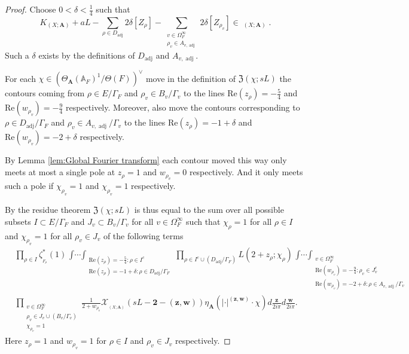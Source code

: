\documentclass[10pt,a4paper]{amsart}
\DeclareMathOperator{\Eff}{\overline{Eff}}
\DeclareMathOperator{\adj}{adj}
\newcommand{\A}{\mathbb{A}}
\renewcommand{\Re}{\mathrm{Re}}
\begin{document}
\begin{proof}
	Choose $0 < \delta < \frac{1}{4}$ such that 
	\begin{equation}
		K_{(X; \mathbf{A})} + aL - \sum_{\rho \in D_{\adj}} 2\delta [Z_{\rho}] - \sum_{\substack{v \in \Omega_{F}^{\infty} \\ \rho_v \in A_{v, \adj}}} 2\delta [Z_{\rho_v}] \in \Eff_{(X; \mathbf{A})}. 
		\label{Choice of delta}
	\end{equation}
	Such a $\delta$ exists by the definitions of $D_{\adj}$ and $A_{v, \adj}$.
	
	For each $\chi \in (\Theta_{\mathbf{A}}(\A_F)^1/\Theta(F))^{\vee}$ move in the definition of $\mathfrak{Z}(\chi; sL)$ the contours coming from $\rho \in E / \Gamma_F$ and $\rho_v \in B_v / \Gamma_v$ to the lines $\Re(z_{\rho}) = -\frac{5}{4}$ and $\Re(w_{\rho_v}) = - \frac{9}{4}$ respectively. Moreover, also move the contours corresponding to $\rho \in D_{\adj} / \Gamma_F$ and $\rho_v \in A_{v, \adj} / \Gamma_v$ to the lines $\Re(z_{\rho}) = -1 + \delta$ and $\Re(w_{\rho_v}) = - 2 + \delta$ respectively.
	
	By Lemma \ref{lem:Global Fourier transform} each contour moved this way only meets at most a single pole at $z_{\rho} = 1$ and $w_{\rho_v} = 0$ respectively. And it only meets such a pole if $\chi_{\rho_v} = 1$ and $\chi_{\rho_v} = 1$ respectively.
	
	By the residue theorem $\mathfrak{Z}(\chi ; s L)$ is thus equal to the sum over all possible subsets $I \subset E/\Gamma_F$ and $J_v \subset B_v / \Gamma_v$ for all $v \in \Omega_{F}^{\infty}$ such that $\chi_{\rho} = 1$ for all $\rho \in I$ and $\chi_{\rho_v} = 1$ for all $\rho_v \in J_v$ of the following terms
	\begin{equation}\label{eq:Terms after moving the contours}
	\begin{split}
		&\prod_{\rho \in I} \zeta^*_{_{F_{\rho}}}(1) \mathop{\int \cdots \int}_{\substack{ \Re(z_{\rho}) = -\frac{5}{4}: \rho \in I^c \\ \Re(z_{\rho}) = - 1 + \delta: \rho \in D_{\adj}/ \Gamma_{F}}} \prod_{\rho \in I^c \cup (D_{\adj}/ \Gamma_{F})} L(2 + z_{\rho} ; \chi_{\rho}) 
		\mathop{\int \cdots \int}_{\substack{v \in \Omega_{F}^{\infty} \\ 
		\Re(w_{\rho_v}) = -\frac{9}{4}: \rho_v \in J_v^c \\ \Re(w_{\rho_v}) = - 2 + \delta: \rho \in A_{v, \adj} / \Gamma_v}} \\
		&\prod_{\substack{v \in \Omega_{F}^{\infty} \\ \rho_v \in J_v \cup (B_v/ \Gamma_v) \\ \chi_{\rho_v} = 1}} \frac{1}{2 + w_{\rho_v}} 
		\mathcal{X}_{\Eff_{(X; \mathbf{A})}}(s L - \mathbf{2} - (\bm{z}, \bm{w})) \eta_{\mathbf{A}}(|\cdot|^{(\bm{z}, \bm{w})} \cdot \chi)
		d\frac{\bm{z}}{2 i \pi} d \frac{\bm{w}}{2 i \pi}.
	\end{split}
	\end{equation}
	Here $z_{\rho} = 1 $ and $w_{\rho_v} = 1$ for $\rho \in I$ and $\rho_v \in J_v$ respectively.
	

\end{proof}
\end{document}
